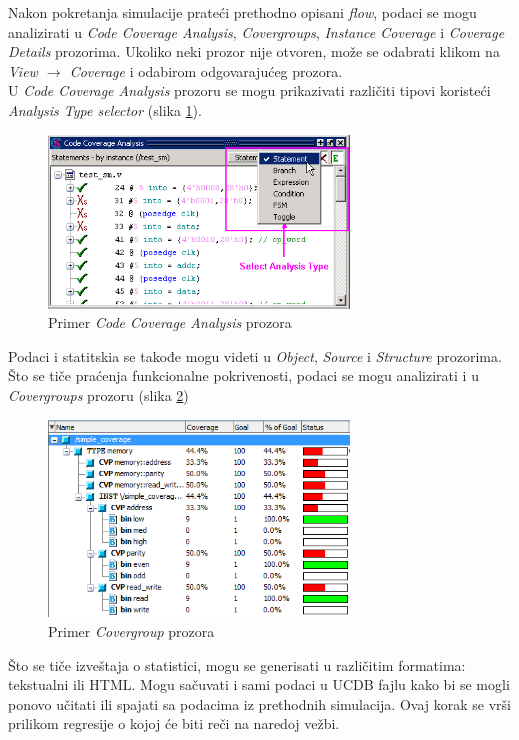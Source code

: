 Nakon pokretanja simulacije prateći prethodno opisani \emph{flow}, podaci se
mogu analizirati u \emph{Code Coverage Analysis}, \emph{Covergroups},
\emph{Instance Coverage} i \emph{Coverage Details} prozorima. Ukoliko neki
prozor nije otvoren, može se odabrati klikom na \emph{View \(\rightarrow\)
  Coverage} i odabirom odgovarajućeg prozora.\\

U \emph{Code Coverage Analysis} prozoru se mogu prikazivati različiti tipovi
koristeći \emph{Analysis Type selector} (slika
\ref{fig:questa_code_coverage_analysis}).

\begin{figure}[h!]
  \center
  \includegraphics[width=80mm, scale=0.5]{img/v11_questa_code_coverage_analysis.png}
  \caption{Primer \emph{Code Coverage Analysis} prozora}
  \label{fig:questa_code_coverage_analysis}
\end{figure}

Podaci i statitskia se takođe mogu videti u \emph{Object}, \emph{Source} i
\emph{Structure} prozorima.
Što se tiče praćenja funkcionalne pokrivenosti, podaci se mogu analizirati i u
\emph{Covergroups} prozoru (slika \ref{fig:questa_covergroup_window})

\begin{figure}[h!]
  \center
  \includegraphics[width=80mm, scale=0.5]{img/v11_simple_coverage.png}
  \caption{Primer \emph{Covergroup} prozora}
  \label{fig:questa_covergroup_window}
\end{figure}

Što se tiče izveštaja o statistici, mogu se generisati u različitim formatima:
tekstualni ili HTML. Mogu sačuvati i sami podaci u UCDB fajlu kako bi se mogli
ponovo učitati ili spajati sa podacima iz prethodnih simulacija. Ovaj korak se
vrši prilikom regresije o kojoj će biti reči na naredoj vežbi.\\

